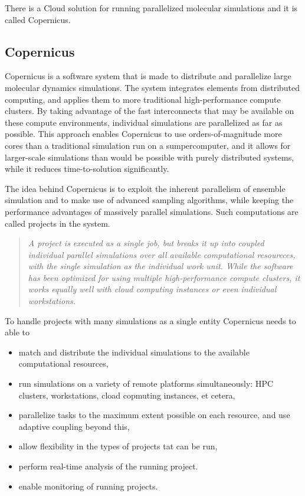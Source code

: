 

There is a Cloud solution for running parallelized molecular
simulations and it is called Copernicus.


\subsection{Copernicus}
Copernicus is a software system that is made to distribute and
parallelize large molecular dynamics simulations. The system
integrates elements from distributed computing, and applies them to
more traditional high-performance compute clusters. By taking
advantage of the fast interconnects that may be available on these
compute environments, individual simulations are parallelized as far
as possible. This approach enables Copernicus to use
orders-of-magnitude more cores than a traditional simulation run on a
sumpercomputer, and it allows for larger-scale simulations than would
be possible with purely distributed systems, while it reduces
time-to-solution significantly.

The idea behind Copernicus is to exploit the inherent parallelism of
ensemble simulation and to make use of advanced sampling algorithms,
while keeping the performance advantages of massively parallel
simulations. Such computations are called projects in the system.

\begin{quote} \slshape
  A project is executed as a single job, but breaks it up into coupled
  individual parallel simulations over all available computational
  resoureces, with the single simulation as the individual work
  unit. While the software has been optimized for using multiple
  high-performance compute clusters, it works equally well with cloud
  computing instances or even individual
  workstations.\citep{pronk:2011}
\end{quote}

To handle projects with many simulations as a single entity Copernicus
needs to able to
\renewcommand{\labelitemi}{-}
\begin{itemize} \slshape
\item match and distribute the individual simulations to the available
  computational resources,
\item run simulations on a variety of remote platforms simultaneously:
  HPC clusters, workstations, cload copmuting instances, et cetera,
\item parallelize tasks to the maximum extent possible on each
  resource, and use adaptive coupling beyond this,
\item allow flexibility in the types of projects tat can be run,
\item perform real-time analysis of the running project.
\item enable monitoring of running projects.\citep{pronk:2011}
\end{itemize}

